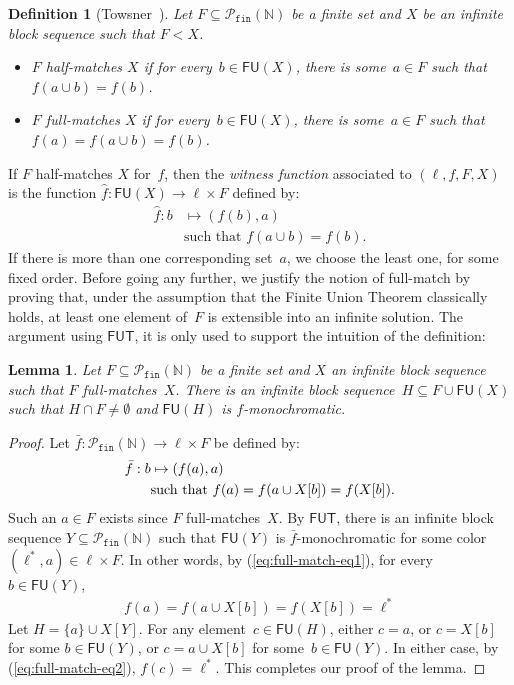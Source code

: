 \documentclass[10pt,a4paper]{article}
\newcommand{\FUT}[0]{\mathsf{FUT}}
\newcommand{\NN}[0]{\mathbb{N}}
\newcommand{\Pfin}{\mathcal{P}_{\mathtt{fin}}}
\newcommand{\FU}[0]{\mathsf{FU}} %
\numberwithin{theorem}{section}
\newtheorem{lemma}[theorem]{Lemma}
\newtheorem{definition}[theorem]{Definition}
\begin{document}
\begin{definition}[Towsner~\cite{towsnerSimpleProofDifficult2012}]
Let $F \subseteq \Pfin(\NN)$ be a finite set and $X$ be an infinite block sequence such that $F < X$.
\begin{itemize}
    \item[(1)] $F$ \emph{half-matches} $X$ if for every~$b \in \FU(X)$, there is some~$a \in F$ such that $f(a \cup b) = f(b)$.
    \item[(2)] $F$ \emph{full-matches} $X$ if for every~$b \in \FU(X)$, there is some~$a \in F$ such that $f(a) = f(a \cup b) = f(b)$.
\end{itemize}
\end{definition}

If $F$ half-matches $X$ for~$f$, then the \emph{witness function} associated to $(\ell, f, F, X)$ is the function $\hat f : \FU(X) \to \ell \times F$ defined by:
\begin{align*}
\hat f : b & \mapsto (f(b), a)\\
& \text{such that } f(a \cup b) = f(b).
\end{align*}
If there is more than one corresponding set~$a$, we choose the least one, for some fixed order. Before going any further, we justify the notion of full-match by proving that, under the assumption that the Finite Union Theorem classically holds, at least one element of~$F$ is extensible into an infinite solution. The argument using $\FUT$, it is only used to support the intuition of the definition:

\begin{lemma}
Let $F \subseteq \Pfin(\NN)$ be a finite set and $X$ an infinite block sequence such that $F$ full-matches~$X$.
There is an infinite block sequence~$H \subseteq F \cup \FU(X)$ such that $H \cap F \neq \emptyset$ and $\FU(H)$ is $f$-monochromatic. 
\end{lemma}
\begin{proof}
Let $\bar f : \Pfin(\NN) \to \ell \times F$ be defined by:
\begin{align}\label{eq:full-match-eq1}
\bar f : b & \mapsto (f(a), a) \notag \\
& \text{such that } f(a) = f(a \cup X[b]) = f(X[b]).
\end{align}
Such an $a \in F$ exists since $F$ full-matches~$X$.
By $\FUT$, there is an infinite block sequence $Y \subseteq \Pfin(\NN)$ such that $\FU(Y)$ is $\bar f$-monochromatic for some color $(\ell^*, a) \in \ell \times F$. In other words, by (\ref{eq:full-match-eq1}), for every~$b \in \FU(Y)$,
\begin{align}\label{eq:full-match-eq2}
f(a) = f(a \cup X[b]) = f(X[b]) = \ell^*
\end{align}
Let $H = \{a\} \cup X[Y]$. For any element~$c \in \FU(H)$, either $c = a$, or $c = X[b]$ for some $b \in \FU(Y)$, or $c = a \cup X[b]$ for some~$b \in \FU(Y)$. In either case, by (\ref{eq:full-match-eq2}), $f(c) = \ell^*$. This completes our proof of the lemma.
\end{proof}
\end{document}
